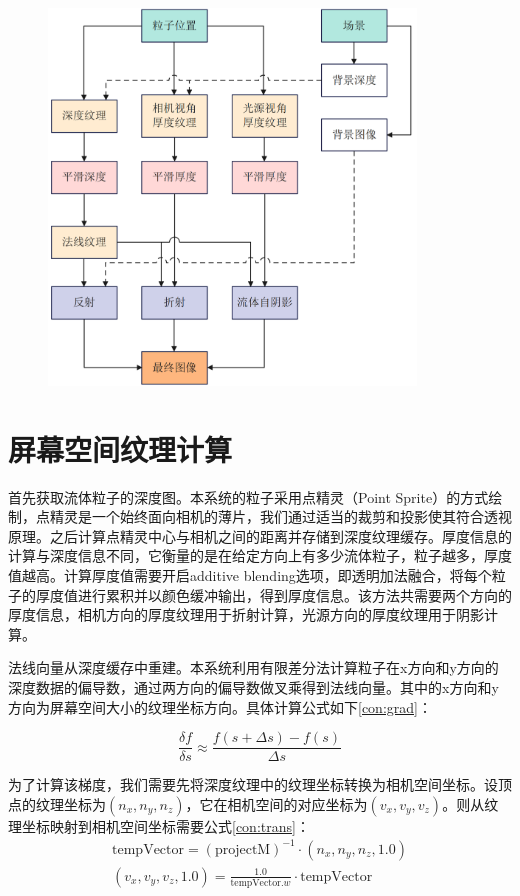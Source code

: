 \begin{figure}[ht]
    \centering
    \includegraphics[height=10cm]{image/renderPipeline.png}
    \label{fig:renderPipeline}
\end{figure}


\section{屏幕空间纹理计算}


首先获取流体粒子的深度图。本系统的粒子采用点精灵（Point Sprite）的方式绘制，点精灵是一个始终面向相机的薄片，我们通过适当的裁剪和投影使其符合透视原理。之后计算点精灵中心与相机之间的距离并存储到深度纹理缓存。厚度信息的计算与深度信息不同，它衡量的是在给定方向上有多少流体粒子，粒子越多，厚度值越高。计算厚度值需要开启additive blending选项，即透明加法融合，将每个粒子的厚度值进行累积并以颜色缓冲输出，得到厚度信息。该方法共需要两个方向的厚度信息，相机方向的厚度纹理用于折射计算，光源方向的厚度纹理用于阴影计算。

法线向量从深度缓存中重建。本系统利用有限差分法计算粒子在x方向和y方向的深度数据的偏导数，通过两方向的偏导数做叉乘得到法线向量。其中的x方向和y方向为屏幕空间大小的纹理坐标方向。具体计算公式如下\ref{con:grad}：

\begin{equation}
    \frac{\delta f}{\delta s} \approx \frac{f(s+\Delta s) - f(s)}{\Delta s}
    \label{con:grad}
\end{equation}

为了计算该梯度，我们需要先将深度纹理中的纹理坐标转换为相机空间坐标。设顶点的纹理坐标为$(n_x,n_y,n_z)$，它在相机空间的对应坐标为$(v_x,v_y,v_z)$。则从纹理坐标映射到相机空间坐标需要公式\ref{con:trans}：
\begin{equation}
    \begin{aligned}
    \text{tempVector} = (\text{projectM})^{-1}\cdot (n_x,n_y,n_z,1.0) \\
    (v_x,v_y,v_z,1.0) = \frac{1.0}{\text{tempVector}.w} \cdot \text{tempVector}
    \end{aligned}
    \label{con:trans}
\end{equation}


